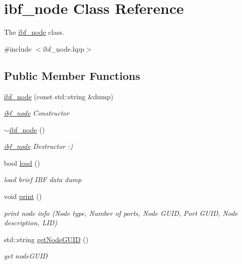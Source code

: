 \hypertarget{classibf__node}{}\section{ibf\+\_\+node Class Reference}
\label{classibf__node}


The \mbox{\hyperlink{classibf__node}{ibf\+\_\+node}} class.  




{\ttfamily \#include $<$ibf\+\_\+node.\+hpp$>$}

\subsection*{Public Member Functions}
\begin{DoxyCompactItemize}
\item 
\mbox{\hyperlink{classibf__node_a523e0518169d8e30b68d9188a51b6c1a}{ibf\+\_\+node}} (const std\+::string \&dump)
\begin{DoxyCompactList}\small\item\em \mbox{\hyperlink{classibf__node}{ibf\+\_\+node}} Constructor \end{DoxyCompactList}\item 
\mbox{\label{classibf__node_a7c1bd854dcd000836d893a20cb3f4864}} 
\mbox{\hyperlink{classibf__node_a7c1bd854dcd000836d893a20cb3f4864}{$\sim$ibf\+\_\+node}} ()
\begin{DoxyCompactList}\small\item\em \mbox{\hyperlink{classibf__node}{ibf\+\_\+node}} Destructor \+:) \end{DoxyCompactList}\item 
bool \mbox{\hyperlink{classibf__node_ab9fb02d662040776f493cecc38b8d09a}{load}} ()
\begin{DoxyCompactList}\small\item\em load brief I\+BF data dump \end{DoxyCompactList}\item 
\mbox{\label{classibf__node_a6ad6f5730885761558dbcdd49a476246}} 
void \mbox{\hyperlink{classibf__node_a6ad6f5730885761558dbcdd49a476246}{print}} ()
\begin{DoxyCompactList}\small\item\em print node info (Node type, Number of ports, Node G\+U\+ID, Port G\+U\+ID, Node description, L\+ID) \end{DoxyCompactList}\item 
std\+::string \mbox{\hyperlink{classibf__node_afe265cfd9c0423988b063c0356058a99}{get\+Node\+G\+U\+ID}} ()
\begin{DoxyCompactList}\small\item\em get node\+G\+U\+ID \end{DoxyCompactList}\end{DoxyCompactItemize}


